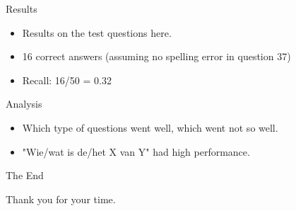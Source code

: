 \documentclass[pdf]{beamer}
\begin{document}
  \begin{frame}{Results}
    \begin{itemize}
      \item Results on the test questions here.
      \item 16 correct answers (assuming no spelling error in question 37)
      \item Recall: 16/50 = 0.32
    \end{itemize}
  \end{frame}
  
  \begin{frame}{Analysis}
    \begin{itemize}
      \item Which type of questions went well, which went not so well.
      \item "Wie/wat is de/het X van Y" had high performance.
    \end{itemize}
  \end{frame}

  \begin{frame}{The End}
    \begin{center}
      Thank you for your time.
    \end{center}
  \end{frame}
\end{document}
